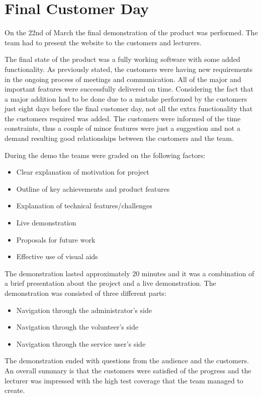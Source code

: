 \documentclass{l3proj}
\begin{document}
\section{Final Customer Day}
\label{sec:finalDay}

On the 22nd of March the final demonstration of the product was performed. The team had to present the website to the customers and lecturers.

The final state of the product was a fully working software with some added functionality. As previously stated, the customers were having new requirements in the ongoing process of meetings and communication. All of the major and important features were successfully delivered on time. Considering the fact that a major addition had to be done due to a mistake performed by the customers just eight days before the final customer day, not all the extra functionality that the customers required was added. The customers were informed of the time constraints, thus a couple of minor features were just a suggestion and not a demand resulting good relationships between the customers and the team.

During the demo the teams were graded on the following factors:
\begin{itemize}
	\item Clear explanation of motivation for project
	\item Outline of key achievements and product features
	\item Explanation of technical features/challenges
	\item Live demonstration
	\item Proposals for future work
\item Effective use of visual aids
\end{itemize}
The demonstration lasted approximately 20 minutes and it was a combination of a brief presentation about the project and a live demonstration. The demonstration was consisted of three different parts:

\begin{itemize}
	\item Navigation through the administrator's side
	\item Navigation through the volunteer's side
	\item Navigation through the service user's side
\end{itemize}

The demonstration ended with questions from the audience and the customers. An overall summary is that the customers were satisfied of the progress and the lecturer was impressed with the high test coverage that the team managed to create.
\end{document}
